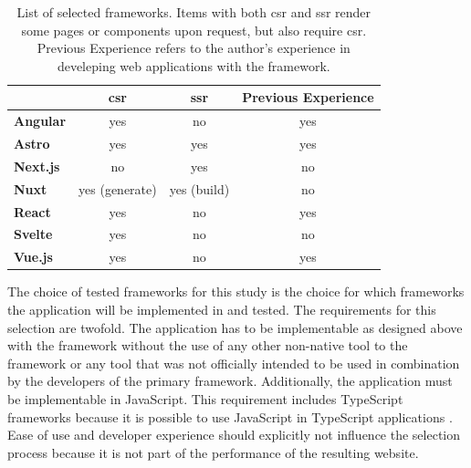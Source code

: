 \documentclass[a4paper, 12pt]{article}
\begin{document}
\begin{table}[b]
  \begin{center}
    \begin{tabular}[h]{|l|c|c|c|}
      \hline
      ~                 & \textbf{\acrshort{csr}} & \textbf{\acrshort{ssr}} & \textbf{Previous Experience}  \\ \hline
      \textbf{Angular}  & yes                     & no                      & yes                           \\ \hline
      \textbf{Astro}    & yes                     & yes                     & yes                           \\ \hline
      \textbf{Next.js}  & no                      & yes                     & no                            \\ \hline
      \textbf{Nuxt}     & yes (generate)          & yes (build)             & no                            \\ \hline
      \textbf{React}    & yes                     & no                      & yes                           \\ \hline
      \textbf{Svelte}   & yes                     & no                      & no                            \\ \hline
      \textbf{Vue.js}   & yes                     & no                      & yes                           \\ \hline
    \end{tabular}
  \end{center}
  \caption{List of selected frameworks. Items with both \acrfull{csr} and \acrfull{ssr} render some pages or components upon request, but also require \acrfull{csr}. Previous Experience refers to the author's experience in develeping web applications with the framework.}
  \label{tab:frameworks}
\end{table}

The choice of tested frameworks for this study is the choice for which frameworks the application will be implemented in and tested.
The requirements for this selection are twofold.
The application has to be implementable as designed above with the framework without the use of any other non-native tool to the framework or any tool that was not officially intended to be used in combination by the developers of the primary framework.
Additionally, the application must be implementable in JavaScript.
This requirement includes TypeScript frameworks because it is possible to use JavaScript in TypeScript applications \citep{typescript}.
Ease of use and developer experience should explicitly not influence the selection process because it is not part of the performance of the resulting website.
\end{document}
